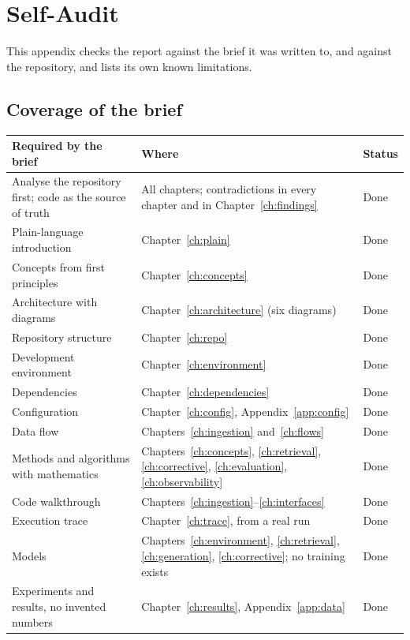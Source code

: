 \chapter{Self-Audit}
\label{app:audit}

This appendix checks the report against the brief it was written to, and against the repository, and lists its own known limitations.

\section{Coverage of the brief}

\begin{longtable}{@{}>{\raggedright\arraybackslash}p{5.6cm}>{\raggedright\arraybackslash}p{7.6cm}>{\raggedright\arraybackslash}p{2.6cm}@{}}
\toprule
\textbf{Required by the brief} & \textbf{Where} & \textbf{Status}\\
\midrule
\endhead
Analyse the repository first; code as the source of truth & All chapters; contradictions in every chapter and in Chapter~\ref{ch:findings} & Done\\
Plain-language introduction & Chapter~\ref{ch:plain} & Done\\
Concepts from first principles & Chapter~\ref{ch:concepts} & Done\\
Architecture with diagrams & Chapter~\ref{ch:architecture} (six diagrams) & Done\\
Repository structure & Chapter~\ref{ch:repo} & Done\\
Development environment & Chapter~\ref{ch:environment} & Done\\
Dependencies & Chapter~\ref{ch:dependencies} & Done\\
Configuration & Chapter~\ref{ch:config}, Appendix~\ref{app:config} & Done\\
Data flow & Chapters~\ref{ch:ingestion} and~\ref{ch:flows} & Done\\
Methods and algorithms with mathematics & Chapters~\ref{ch:concepts}, \ref{ch:retrieval}, \ref{ch:corrective}, \ref{ch:evaluation}, \ref{ch:observability} & Done\\
Code walkthrough & Chapters~\ref{ch:ingestion}--\ref{ch:interfaces} & Done\\
Execution trace & Chapter~\ref{ch:trace}, from a real run & Done\\
Models & Chapters~\ref{ch:environment}, \ref{ch:retrieval}, \ref{ch:generation}, \ref{ch:corrective}; no training exists & Done\\
Experiments and results, no invented numbers & Chapter~\ref{ch:results}, Appendix~\ref{app:data} & Done\\

\end{longtable}
